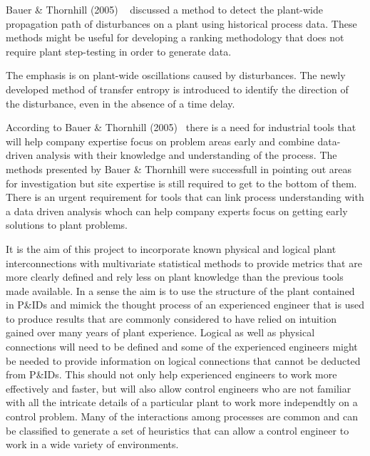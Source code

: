 \documentclass[a4paper]{book}
\begin{document}



Bauer \& Thornhill (2005) ~\cite{Bauer2005} discussed a method to detect the plant-wide propagation path of disturbances on a plant using historical process data.
These methods might be useful for developing a ranking methodology that does not require plant step-testing in order to generate data.

The emphasis is on plant-wide oscillations caused by disturbances.
The newly developed method of transfer entropy is introduced to identify the direction of the disturbance, even in the absence of a time delay.

According to Bauer \& Thornhill (2005)~\cite{Bauer2005} there is a need for industrial tools that will help company expertise focus on problem areas early and combine data-driven analysis with their knowledge and understanding of the process.
The methods presented by Bauer \& Thornhill were successfull in pointing out areas for investigation but site expertise is still required to get to the bottom of them.
There is an urgent requirement for tools that can link process understanding with a data driven analysis whoch can help company experts focus on getting early solutions to plant problems.

It is the aim of this project to incorporate known physical and logical plant interconnections with multivariate statistical methods to provide metrics that are more clearly defined and rely less on plant knowledge than the previous tools made available.
In a sense the aim is to use the structure of the plant contained in P\&IDs and mimick the thought process of an experienced engineer that is used to produce results that are commonly considered to have relied on intuition gained over many years of plant experience.
Logical as well as physical connections will need to be defined and some of the experienced engineers might be needed to provide information on logical connections that cannot be deducted from P\&IDs.
This should not only help experienced engineers to work more effectively and faster, but will also allow control engineers who are not familiar with all the intricate details of a particular plant to work more independtly on a control problem.
Many of the interactions among processes are common and can be classified to generate a set of heuristics that can allow a control engineer to work in a wide variety of environments.
\end{document}
